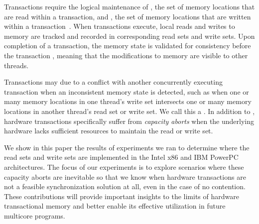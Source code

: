 Transactions require the logical 
maintenance of , the set
of memory locations that are read within a 
transaction, and , the set
of memory locations that are written within 
a transaction~\cite{HerlihyMo93}. When transactions execute, 
local reads and writes to memory 
are tracked and recorded in
corresponding read sets and write sets. Upon 
completion of a transaction, the memory state is validated for 
consistency before the transaction
, meaning that the modifications to 
memory are visible to other threads.

Transactions may  due to a conflict with
another concurrently executing transaction when an
inconsistent memory state is detected, 
such as when one or many memory locations
in one thread's write set intersects one or 
many memory locations in another
thread's read set or write set.  We call this a
.  In addition to ,
hardware transactions specifically suffer 
from \textit{capacity aborts} when the underlying hardware
lacks sufficient resources to maintain the
read or write set.

We show in this paper the results of experiments 
we ran to determine where the
read sets and write sets are implemented in the 
Intel x86 and IBM PowerPC
architectures. The focus of our experiments is to 
explore scenarios where these
capacity aborts are inevitable so that we know 
when hardware transactions are
not a feasible synchronization solution at all, 
even in the case of no
contention. These contributions will provide 
important insights to the limits of
hardware transactional memory and better enable 
its effective utilization in
future multicore programs.
 
